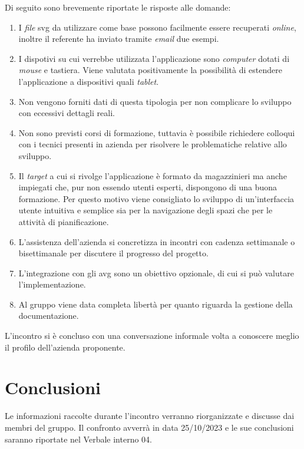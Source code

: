 \noindent
Di seguito sono brevemente riportate le risposte alle domande:
\begin{enumerate}
    \item I \textit{file} svg da utilizzare come base possono facilmente essere recuperati \textit{online}, inoltre il referente ha inviato tramite \textit{email} due esempi.
    \item I dispotivi su cui verrebbe utilizzata l'applicazione sono \textit{computer} dotati di \textit{mouse} e tastiera. Viene valutata positivamente la possibilità di estendere l'applicazione a dispositivi quali \textit{tablet}.
    \item Non vengono forniti dati di questa tipologia per non complicare lo sviluppo con eccessivi dettagli reali.
	\item Non sono previsti corsi di formazione, tuttavia è possibile richiedere colloqui con i tecnici presenti in azienda per risolvere le problematiche relative allo sviluppo.
	\item Il \textit{target} a cui si rivolge l'applicazione è formato da magazzinieri ma anche impiegati che, pur non essendo utenti esperti, dispongono di una buona formazione. Per questo motivo viene consigliato lo sviluppo di un'interfaccia utente intuitiva e semplice sia per la navigazione degli spazi che per le attività di pianificazione.
    \item L'assistenza dell'azienda si concretizza in incontri con cadenza settimanale o bisettimanale per discutere il progresso del progetto.
	\item L'integrazione con gli avg sono un obiettivo opzionale, di cui si può valutare l'implementazione.
    \item Al gruppo viene data completa libertà per quanto riguarda la gestione della documentazione. 
\end{enumerate}

\noindent
L'incontro si è concluso con una conversazione informale volta a conoscere meglio il profilo dell'azienda proponente.

\section{Conclusioni}
Le informazioni raccolte durante l'incontro verranno riorganizzate e discusse dai membri del gruppo.
Il confronto avverrà in data 25/10/2023 e le sue conclusioni saranno riportate nel Verbale interno 04.